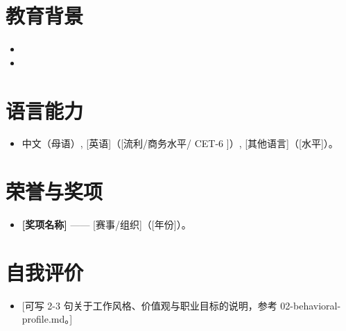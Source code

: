 \documentclass[11pt,a4paper,sans]{moderncv}
\begin{document}

\section{教育背景}
\vspace{1pt}
\begin{itemize}

\item{}

\vspace{3pt}

\item{}

\end{itemize}


\section{语言能力}
\vspace{1pt}
\begin{itemize}
\item 中文（母语）, [英语]（[流利/商务水平/ CET-6 ]）, [其他语言]（[水平]）。
\end{itemize}


\section{荣誉与奖项}
\vspace{1pt}
\begin{itemize}
\item{\textbf{[奖项名称]} —— [赛事/组织]（[年份]）。}
\end{itemize}


\section{自我评价}
\vspace{1pt}
\begin{itemize}
\item{[可写 2-3 句关于工作风格、价值观与职业目标的说明，参考 02-behavioral-profile.md。]}
\end{itemize}
\end{document}
